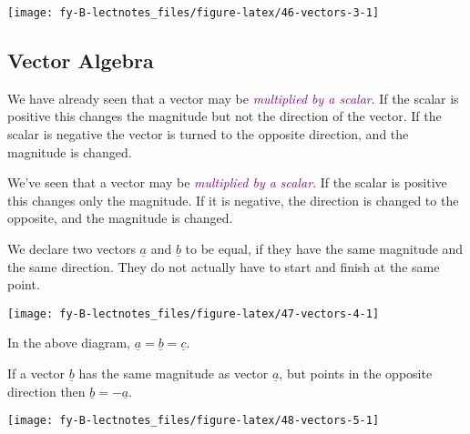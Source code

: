 \documentclass[
  english,
  11pt,
  oneside]{book}
\newcommand{\slide}{}
\theoremstyle{definition}
\theoremstyle{definition}
\theoremstyle{definition}
\theoremstyle{definition}
\theoremstyle{remark}
\begin{document}
\begin{center}\texttt{[image: fy-B-lectnotes\_files/figure-latex/46-vectors-3-1]} \end{center}

\slide

\subsection{Vector Algebra}\label{vector-algebra}

\begin{notslides}

We have already seen that a vector may be \textcolor{purple}{\em multiplied by a scalar}. If the scalar is positive this changes the magnitude but not the direction of the vector. If the scalar is negative the vector is turned to the opposite direction, and the magnitude is changed.

\end{notslides}

\begin{slidesonly}

We've seen that a vector may be \textcolor{purple}{\em multiplied by a scalar}.
If the scalar is positive this changes only the magnitude.
If it is negative, the direction is changed to the
opposite, and the magnitude is changed.

\end{slidesonly}

We declare two vectors \(\underline{a}\) and \(\underline{b}\) to be equal, if they have the same magnitude and the same direction. They do not actually have to start and finish at the same point.

\begin{center}\texttt{[image: fy-B-lectnotes\_files/figure-latex/47-vectors-4-1]} \end{center}

In the above diagram, \(\underline a= \underline b = \underline c\).

\slide

If a vector \(\underline b\) has the same magnitude as vector \(\underline a\), but points in the opposite direction then \(\underline b = -\underline a\).

\begin{center}\texttt{[image: fy-B-lectnotes\_files/figure-latex/48-vectors-5-1]} \end{center}
\end{document}
